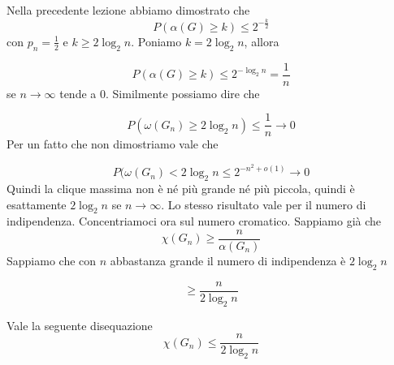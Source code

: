 \documentclass[12pt]{report}
\begin{document}
\noindent
Nella precedente lezione abbiamo dimostrato che 
$$P(\alpha(G) \geq k) \leq 2^{-\frac{k}{2}}$$
con $p_n = \frac{1}{2}$ e $k \geq 2\log_2{n}$. Poniamo $k = 2\log_2{n}$, allora

$$P(\alpha(G) \geq k) \leq 2^{-\log_2{n}} = \frac{1}{n}$$
se $n\rightarrow \infty$ tende a $0$. Similmente possiamo dire che 

$$P(\omega(G_n) \geq 2\log_2{n}) \leq \frac{1}{n} \rightarrow 0$$
Per un fatto che non dimostriamo vale che

$$P(\omega(G_n) < 2\log_2{n} \leq 2^{-n^2 + o(1)} \rightarrow 0$$
Quindi la clique massima non è né più grande né più piccola, quindi è esattamente $2\log_2{n}$ se $n \rightarrow \infty$. Lo stesso risultato vale per il numero di indipendenza.
Concentriamoci ora sul numero cromatico. Sappiamo già che 
$$\chi(G_n) \geq \frac{n}{\alpha(G_n)}$$
Sappiamo che con $n$ abbastanza grande il numero di indipendenza è $2\log_2{n}$

$$\geq \frac{n}{2\log_2{n}}$$

\begin{fatto}
    Vale la seguente disequazione
    $$\chi(G_n) \leq \frac{n}{2\log_2{n}}$$
\end{fatto}
\end{document}
